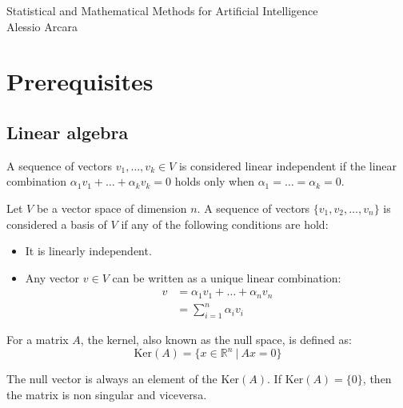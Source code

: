 \documentclass{article}
\author{Alessio Arcara}
\begin{document}
\begin{titlepage}
    \vspace*{\fill}
   \centering
   \Huge Statistical and Mathematical Methods for Artificial Intelligence\\
   \Large Alessio Arcara
    \vspace*{\fill}
\end{titlepage}

\tableofcontents
\clearpage

\parindent 0pt

\section{Prerequisites}
\subsection{Linear algebra}
\begin{definition}
    A sequence of vectors $v_1,\ldots,v_k\in V$ is considered linear
    independent if the linear combination $\alpha_1v_1+\ldots+\alpha_kv_k=0$
    holds only when $\alpha_1=\ldots=\alpha_k=0$.
\end{definition}
\begin{definition}[Basis]
    Let $V$ be a vector space of dimension $n$. A sequence of vectors
    $\{v_1,v_2,\ldots,v_n\}$ is considered a basis of $V$ if any of the
    following conditions are hold:
    \begin{itemize}
        \item It is linearly independent.
        \item Any vector $v\in V$ can be written as a unique linear
            combination: 
            $$
            \begin{aligned}
                v&=\alpha_1v_1+\ldots+\alpha_nv_n\\
                 &=\sum_{i=1}^{n}\alpha_iv_i
            \end{aligned}
            $$
    \end{itemize}
\end{definition}
\begin{definition}
    For a matrix $A$, the kernel, also known as the null space, is defined as:
    $$\text{Ker}(A)=\{x\in \mathbb{R}^n\ |\ Ax=0\}$$
\end{definition}
The null vector is always an element of the $\text{Ker}(A)$. If
$\text{Ker}(A)=\{0\}$, then the matrix is non singular and viceversa.
\end{document}
